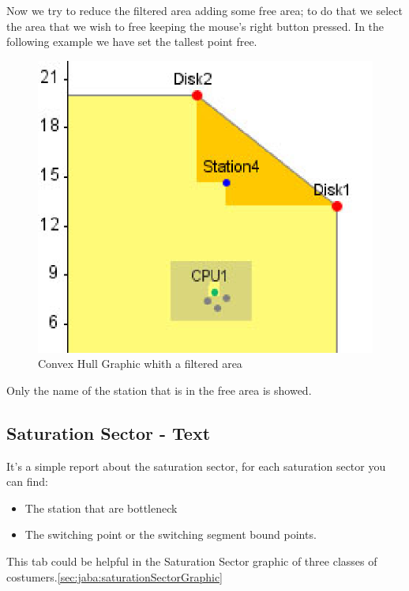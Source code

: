 Now we try to reduce the filtered area adding some free area; to do that we select the area that we wish to free keeping the mouse's right button pressed. In the following example we have set the tallest point free.
\begin{figure}[htbp]
    \begin{center}
        \includegraphics[scale=.5]{img/jaba/convexHullFree}
    \end{center}
    \caption{Convex Hull Graphic whith a filtered area}
    \label{fig:jaba:convexHullaFree}
\end{figure}

Only the name of the station that is in the free area is showed.


\subsection{Saturation Sector - Text}
\label{sec:jaba:saturationSectorText}
It's a simple report about the saturation sector, for each saturation sector you can find:
\begin{itemize}
\item The station that are bottleneck
\item The switching point or the switching segment bound points.
\end{itemize}
This tab could be helpful in the Saturation Sector graphic of three classes of costumers.\autoref{sec:jaba:saturationSectorGraphic}



